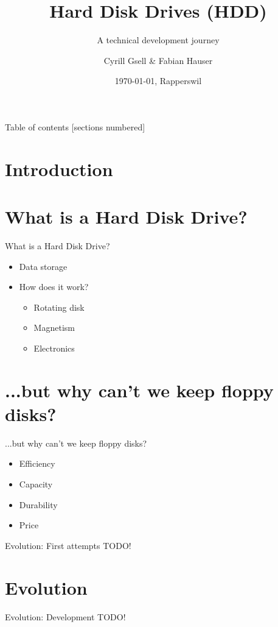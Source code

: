 \documentclass[12pt]{beamer}
\title{Hard Disk Drives (HDD)}
\subtitle{A technical development journey}
\date{\today, Rapperswil}
\author{Cyrill Gsell \& Fabian Hauser}
\institute{Computer Science \\
	TecBEC Presentation FS 2016}
\newlength{\wideitemsep}
\let\olditem\item
\renewcommand{\item}{\setlength{\itemsep}{\wideitemsep}\olditem}
\begin{document}
\maketitle

\begin{frame}{Table of contents}
  [sections numbered]
  \tableofcontents
\end{frame}

\section{Introduction}
\section{What is a Hard Disk Drive?}
\begin{frame}[fragile]{What is a Hard Disk Drive?}
	\begin{itemize}
		\item Data storage
		\item How does it work?
			\begin{itemize}
				\item Rotating disk
				\item Magnetism
				\item Electronics
			\end{itemize}
	\end{itemize}
\end{frame}

\section{...but why can't we keep floppy disks?}
\begin{frame}[fragile]{...but why can't we keep floppy disks?}
	\begin{itemize}
		\item Efficiency
		\item Capacity
		\item Durability
		\item Price
	\end{itemize}		
\end{frame}

\begin{frame}[fragile]{Evolution: First attempts}
	TODO!	
\end{frame}

\section{Evolution}
\begin{frame}[fragile]{Evolution: Development}
	TODO!	
\end{frame}
\end{document}
